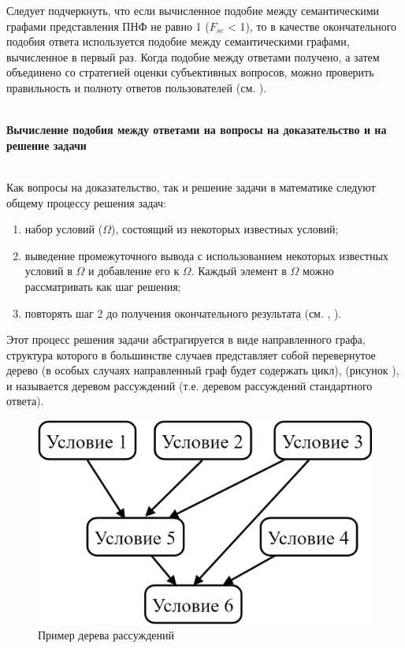 Следует подчеркнуть, что если вычисленное подобие между семантическими графами представления ПНФ не равно 1 ($F_{sc}$ < 1), то в качестве окончательного подобия ответа используется подобие между семантическими графами, вычисленное в первый раз. Когда подобие между ответами получено, а затем объединено со стратегией оценки субъективных вопросов, можно проверить правильность и полноту ответов пользователей (см. ).

~\\
\textbf{Вычисление подобия между ответами на вопросы на доказательство и на решение задачи} 

~\\
Как вопросы на доказательство, так и решение задачи в математике следуют общему процессу решения задач:

\begin{enumerate}
	\item набор условий ($\Omega $), состоящий из некоторых известных условий;
	
	\item выведение промежуточного вывода с использованием некоторых известных условий в $\Omega $ и добавление его к $\Omega $. Каждый элемент в $\Omega $ можно рассматривать как шаг решения;
	
	\item повторять шаг 2 до получения окончательного результата (см. , ).
\end{enumerate}

Этот процесс решения задачи абстрагируется в виде направленного графа, структура которого в большинстве случаев представляет собой перевернутое дерево (в особых случаях направленный граф будет содержать цикл), (рисунок \textit{}), и называется деревом рассуждений (т.е. деревом рассуждений стандартного ответа).

\begin{figure}[H]
	\includegraphics[scale=0.15]{author/part7/figures/reasoning_tree_example.png}
	\caption{Пример дерева рассуждений}
	\label{fig:RT_example}
\end{figure}

